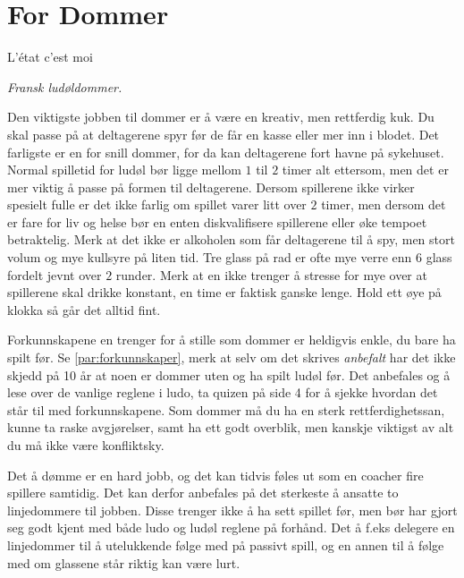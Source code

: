 \documentclass[10pt,a4paper,norsk,openany]{book}
\begin{document}
\chapter{For Dommer}

\epigraph{L'état c'est moi}{\textit{Fransk ludøldommer.}}

Den viktigste jobben til dommer er å være en kreativ, men rettferdig kuk. Du
skal passe på at deltagerene spyr før de får en kasse eller mer inn i blodet.
Det farligste er en for snill dommer, for da kan deltagerene fort havne på
sykehuset. Normal spilletid for ludøl bør ligge mellom $1$ til $2$ timer alt
ettersom, men det er mer viktig å passe på formen til deltagerene. Dersom
spillerene ikke virker spesielt fulle er det ikke farlig om spillet varer litt
over $2$ timer, men dersom det er fare for liv og helse bør en enten
diskvalifisere spillerene eller øke tempoet betraktelig. Merk at det ikke er
alkoholen som får deltagerene til å spy, men stort volum og mye kullsyre på
liten tid. Tre glass på rad er ofte mye verre enn 6 glass fordelt jevnt over $2$
runder. Merk at en ikke trenger å stresse for mye over at spillerene skal drikke
konstant, en time er faktisk ganske lenge. Hold ett øye på klokka så går det
alltid fint.

Forkunnskapene en trenger for å stille som dommer er heldigvis enkle, du bare ha
spilt før. Se \cref{par:forkunnskaper}, merk at selv om det skrives
\emph{anbefalt} har det ikke skjedd på 10 år at noen er dommer uten og ha spilt
ludøl før. Det anbefales og å lese over de vanlige reglene i ludo, ta quizen på
side 4 for å sjekke hvordan det står til med forkunnskapene. Som dommer må du ha
en sterk rettferdighetssan, kunne ta raske avgjørelser, samt ha ett godt
overblik, men kanskje viktigst av alt du må ikke være konfliktsky.

Det å dømme er en hard jobb, og det kan tidvis føles ut som en coacher fire
spillere samtidig. Det kan derfor anbefales på det sterkeste å ansatte to
linjedommere til jobben. Disse trenger ikke å ha sett spillet før, men bør har
gjort seg godt kjent med både ludo og ludøl reglene på forhånd. Det å f.eks
delegere en linjedommer til å utelukkende følge med på passivt spill, og en
annen til å følge med om glassene står riktig kan være lurt. 
\end{document}
